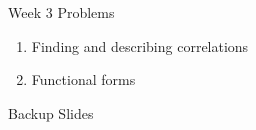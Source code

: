 \documentclass{beamer}
\begin{document}
\begin{frame}{Week 3 Problems}

\begin{enumerate}
\item Finding and describing correlations
\item Functional forms
\end{enumerate}



\end{frame}





\appendix
{}
\setcounter{finalframe}{\value{framenumber}}

\begin{frame}{Backup Slides}
\end{frame}




\setcounter{framenumber}{\value{finalframe}}
\end{document}
